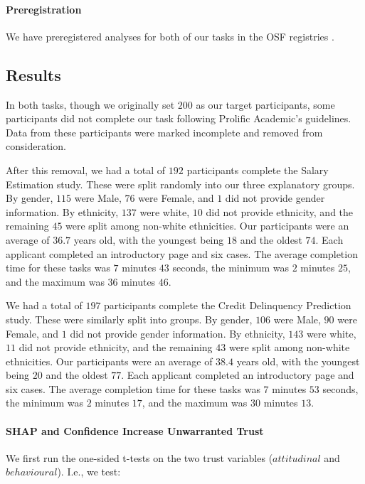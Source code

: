 \paragraph{Preregistration}
We have preregistered analyses for both of our tasks in the OSF registries \cite{natarajan_binns_2022}. 

\subsection{Results}\label{ssec:os_results}
In both tasks, though we originally set $200$ as our target participants, some participants did not complete our task following Prolific Academic's guidelines. Data from these participants were marked incomplete and removed from consideration. 

After this removal, we had a total of $192$ participants complete the Salary Estimation study. These were split randomly into our three explanatory groups. By gender, $115$ were Male, $76$ were Female, and $1$ did not provide gender information. By ethnicity, $137$ were white, $10$ did not provide ethnicity, and the remaining $45$ were split among non-white ethnicities. Our participants were an average of $36.7$ years old, with the youngest being $18$ and the oldest $74$. Each applicant completed an introductory page and six cases. The average completion time for these tasks was $7$ minutes $43$ seconds, the minimum was $2$ minutes $25$, and the maximum was $36$ minutes $46$.

We had a total of $197$ participants complete the Credit Delinquency Prediction study. These were similarly split into groups. By gender, $106$ were Male, $90$ were Female, and $1$ did not provide gender information. By ethnicity, $143$ were white, $11$ did not provide ethnicity, and the remaining $43$ were split among non-white ethnicities. Our participants were an average of $38.4$ years old, with the youngest being $20$ and the oldest $77$. Each applicant completed an introductory page and six cases. The average completion time for these tasks was $7$ minutes $53$ seconds, the minimum was $2$ minutes $17$, and the maximum was $30$ minutes $13$.

\paragraph{SHAP and Confidence Increase Unwarranted Trust}
We first run the one-sided t-tests on the two trust variables ($attitudinal$ and $behavioural$). I.e., we test:

